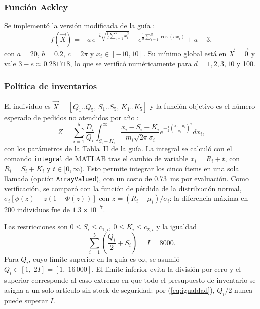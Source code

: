 \documentclass[conference]{IEEEtran}
\begin{document}
\subsubsection{Funci\'on Ackley}
Se implement\'o la versi\'on modificada de la gu\'ia \cite{ackley}:
\begin{equation}
f(\vec{X}) = -a\,e^{-b\sqrt{\frac{1}{d}\sum_{i=1}^{d}x_i^2}} - e^{\frac{1}{d}\sum_{i=1}^{d}\cos(c\,x_i)} + a + 3,
\end{equation}
con $a=20$, $b=0.2$, $c=2\pi$ y $x_i\in[-10,10]$. Su m\'inimo global est\'a en $\vec{X}=\vec{0}$ y vale $3-e\approx0.281718$, lo que se verific\'o num\'ericamente para $d=1,2,3,10$ y 100.

\subsubsection{Pol\'itica de inventarios}
El individuo es $\vec{X}=[Q_1..Q_5,\,S_1..S_5,\,K_1..K_5]$ y la funci\'on objetivo es el n\'umero esperado de pedidos no atendidos por a\~no \cite{gardner,chen}:
\begin{equation}
Z=\sum_{i=1}^{5}\frac{D_i}{Q_i}\int_{S_i+K_i}^{\infty}\frac{x_i-S_i-K_i}{m_i\sqrt{2\pi}\sigma_i}e^{-\frac12\left(\frac{x_i-\mu_i}{\sigma_i}\right)^2}dx_i ,
\end{equation}
con los par\'ametros de la Tabla~II de la gu\'ia. La integral se calcul\'o con el comando \texttt{integral} de MATLAB tras el cambio de variable $x_i=R_i+t$, con $R_i=S_i+K_i$ y $t\in[0,\infty)$. Esto permite integrar los cinco \'items en una sola llamada (opci\'on \texttt{ArrayValued}), con un costo de 0.73~ms por evaluaci\'on. Como verificaci\'on, se compar\'o con la funci\'on de p\'erdida de la distribuci\'on normal, $\sigma_i[\phi(z)-z(1-\Phi(z))]$ con $z=(R_i-\mu_i)/\sigma_i$: la diferencia m\'axima en 200 individuos fue de $1.3\times10^{-7}$.

Las restricciones son $0\le S_i\le c_{1,i}$, $0\le K_i\le c_{2,i}$ y la igualdad
\begin{equation}
\sum_{i=1}^{5}\left(\frac{Q_i}{2}+S_i\right)=I=8000.
\label{eq:igualdad}
\end{equation}
Para $Q_i$, cuyo l\'imite superior en la gu\'ia es $\infty$, se asumi\'o $Q_i\in[1,\;2I]=[1,\;16\,000]$. El l\'imite inferior evita la divisi\'on por cero y el superior corresponde al caso extremo en que todo el presupuesto de inventario se asigna a un solo art\'iculo sin stock de seguridad: por (\ref{eq:igualdad}), $Q_i/2$ nunca puede superar $I$.
\end{document}
